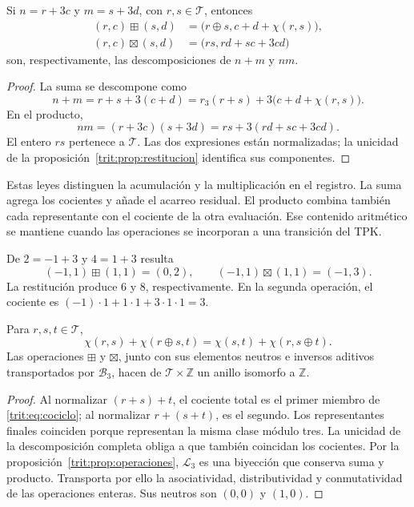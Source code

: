 \begin{proposicion}
\label{trit:prop:operaciones}
Si \(n=r+3c\) y \(m=s+3d\), con \(r,s\in\mathcal T\), entonces
\begin{align}
 (r,c)\boxplus(s,d)
 &=\bigl(r\oplus s,c+d+\chi(r,s)\bigr),
 \label{trit:eq:suma}\\
 (r,c)\boxtimes(s,d)
 &=\bigl(rs,rd+sc+3cd\bigr)
 \label{trit:eq:producto}
\end{align}
son, respectivamente, las descomposiciones de \(n+m\) y \(nm\).
\end{proposicion}
\begin{proof}
La suma se descompone como
\[
 n+m=r+s+3(c+d)
     =r_3(r+s)+3\bigl(c+d+\chi(r,s)\bigr).
\]
En el producto,
\[
 nm=(r+3c)(s+3d)=rs+3(rd+sc+3cd).
\]
El entero \(rs\) pertenece a \(\mathcal T\). Las dos expresiones están
normalizadas; la unicidad de la proposición~\ref{trit:prop:restitucion}
identifica sus componentes.
\end{proof}

Estas leyes distinguen la acumulación y la multiplicación en el registro.
La suma agrega los cocientes y añade el acarreo residual. El producto
combina también cada representante con el cociente de la otra evaluación.
Ese contenido aritmético se mantiene cuando las operaciones se incorporan
a una transición del TPK.

\begin{ejemplo}
De \(2=-1+3\) y \(4=1+3\) resulta
\[
 (-1,1)\boxplus(1,1)=(0,2),\qquad
 (-1,1)\boxtimes(1,1)=(-1,3).
\]
La restitución produce \(6\) y \(8\), respectivamente. En la segunda
operación, el cociente es \((-1)\cdot1+1\cdot1+3\cdot1\cdot1=3\).
\end{ejemplo}

\begin{proposicion}
\label{trit:prop:cociclo}
Para \(r,s,t\in\mathcal T\),
\begin{equation}
 \chi(r,s)+\chi(r\oplus s,t)
 =\chi(s,t)+\chi(r,s\oplus t).
\label{trit:eq:cociclo}
\end{equation}
Las operaciones \(\boxplus\) y \(\boxtimes\), junto con sus elementos
neutros e inversos aditivos transportados por \(\mathcal B_3\), hacen
de \(\mathcal T\times\mathbb Z\) un anillo isomorfo a \(\mathbb Z\).
\end{proposicion}
\begin{proof}
Al normalizar \((r+s)+t\), el cociente total es el primer miembro de
\eqref{trit:eq:cociclo}; al normalizar \(r+(s+t)\), es el segundo.
Los representantes finales coinciden porque representan la misma clase
módulo tres. La unicidad de la descomposición completa obliga a que también
coincidan los cocientes. Por la proposición~\ref{trit:prop:operaciones},
\(\mathcal L_3\) es una biyección que conserva suma y producto. Transporta
por ello la asociatividad, distributividad y conmutatividad de las
operaciones enteras. Sus neutros son \((0,0)\) y \((1,0)\).
\end{proof}

